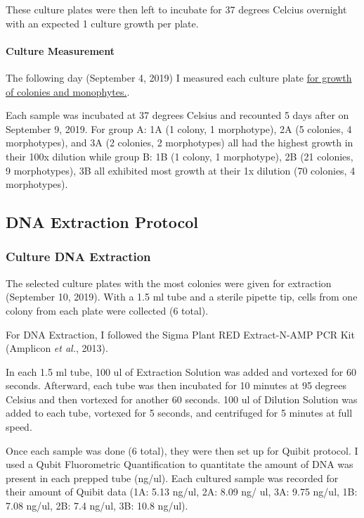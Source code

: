 \documentclass[]{article}
\let\oldparagraph\paragraph
\renewcommand{\paragraph}[1]{\oldparagraph{#1}\mbox{}}
\begin{document}
These culture plates were then left to incubate for 37 degrees Celcius
overnight with an expected 1 culture growth per plate.

\hypertarget{culture-measurement}{%
\paragraph{Culture Measurement}\label{culture-measurement}}

The following day (September 4, 2019) I measured each culture plate
\href{http://https://docs.google.com/spreadsheets/d/1GTZFUkE8nhY6hZebgxoPr_dam9kGWzlqFg1O4--MyUE/edit\#gid=0}{for
growth of colonies and monophytes.}.

Each sample was incubated at 37 degrees Celsius and recounted 5 days
after on September 9, 2019. For group A: 1A (1 colony, 1 morphotype), 2A
(5 colonies, 4 morphotypes), and 3A (2 colonies, 2 morphotypes) all had
the highest growth in their 100x dilution while group B: 1B (1 colony, 1
morphotype), 2B (21 colonies, 9 morphotypes), 3B all exhibited most
growth at their 1x dilution (70 colonies, 4 morphotypes).

\hypertarget{dna-extraction-protocol}{%
\subsection{DNA Extraction Protocol}\label{dna-extraction-protocol}}

\hypertarget{culture-dna-extraction}{%
\subsubsection{Culture DNA Extraction}\label{culture-dna-extraction}}

The selected culture plates with the most colonies were given for
extraction (September 10, 2019). With a 1.5 ml tube and a sterile
pipette tip, cells from one colony from each plate were collected (6
total).

For DNA Extraction, I followed the Sigma Plant RED Extract-N-AMP PCR Kit
(Amplicon \emph{et al.}, 2013).

In each 1.5 ml tube, 100 ul of Extraction Solution was added and
vortexed for 60 seconds. Afterward, each tube was then incubated for 10
minutes at 95 degrees Celsius and then vortexed for another 60 seconds.
100 ul of Dilution Solution was added to each tube, vortexed for 5
seconds, and centrifuged for 5 minutes at full speed.

Once each sample was done (6 total), they were then set up for Quibit
protocol. I used a Qubit Fluorometric Quantification to quantitate the
amount of DNA was present in each prepped tube (ng/ul). Each cultured
sample was recorded for their amount of Quibit data (1A: 5.13 ng/ul, 2A:
8.09 ng/ ul, 3A: 9.75 ng/ul, 1B: 7.08 ng/ul, 2B: 7.4 ng/ul, 3B: 10.8
ng/ul).
\end{document}
